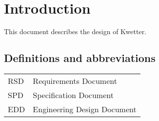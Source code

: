 \chapter{Introduction}
This document describes the design of Kwetter.

\section{Definitions and abbreviations}

\begin{tabularx}{\textwidth}{lX}
    RSD & Requirements Document\\
    SPD & Specification Document\\
    EDD & Engineering Design Document\\
\end{tabularx}